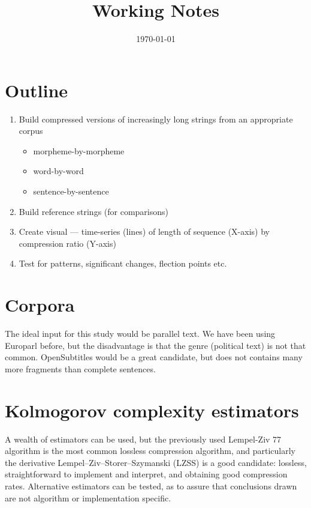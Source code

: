 \documentclass[11pt,a4paper]{article}
\title{Working Notes}
\author{}
\date{\today}
\begin{document}
\maketitle

\section{Outline}

\begin{enumerate}
\item Build compressed versions of increasingly long strings from an appropriate corpus
    \begin{itemize}
    \item morpheme-by-morpheme
    \item word-by-word
    \item sentence-by-sentence
    \end{itemize}
\item Build reference strings (for comparisons)
\item Create visual — time-series (lines) of length of sequence (X-axis) by compression ratio (Y-axis)
\item Test for patterns, significant changes, flection points etc.
\end{enumerate}

\section{Corpora}

The ideal input for this study would be parallel text. We have been using Europarl before, but the disadvantage is that the genre (political text) is not that common. OpenSubtitles would be a great candidate, but does not contains many more fragments than complete sentences. 

\section{Kolmogorov complexity estimators}

A wealth of estimators can be used, but the previously used Lempel-Ziv 77 algorithm is the most common lossless compression algorithm, and particularly the derivative Lempel–Ziv–Storer–Szymanski (LZSS) is a good candidate: lossless, straightforward to implement and interpret, and obtaining good compression rates. Alternative estimators can be tested, as to assure that conclusions drawn are not algorithm or implementation specific.
\end{document}
